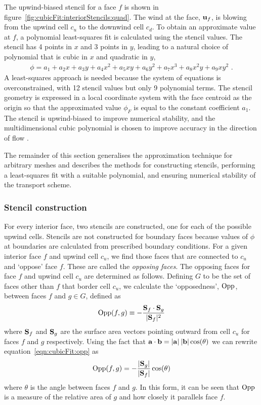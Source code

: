 The upwind-biased stencil for a face $f$ is shown in figure~\ref{fig:cubicFit:interiorStencils:quad}.  The wind at the face, $\mathbf{u}_f$, is blowing from the upwind cell $c_u$ to the downwind cell $c_d$.
To obtain an approximate value at $f$, a polynomial least-squares fit is calculated using the stencil values.
The stencil has \num{4} points in $x$ and \num{3} points in $y$, leading to a natural choice of polynomial that is cubic in $x$ and quadratic in $y$,
\begin{align}
	\phi = a_1 + a_2 x + a_3 y + a_4 x^2 + a_5 xy + a_6 y^2 + a_7 x^3 + a_8 x^2 y + a_9 x y^2 \label{eqn:cubicFit:fullPoly} \text{ .}
\end{align}
A least-squares approach is needed because the system of equations is overconstrained, with \num{12} stencil values but only \num{9} polynomial terms.  The stencil geometry is expressed in a local coordinate system with the face centroid as the origin so that the approximated value $\phi_F$ is equal to the constant coefficient $a_1$.
The stencil is upwind-biased to improve numerical stability, and the multidimensional cubic polynomial is chosen to improve accuracy in the direction of flow \citep{leonard1993}.

The remainder of this section generalises the approximation technique for arbitrary meshes and describes the methods for constructing stencils, performing a least-squares fit with a suitable polynomial, and ensuring numerical stability of the transport scheme.

\subsubsection{Stencil construction}
\label{sec:cubicFit:stencil}

For every interior face, two stencils are constructed, one for each of the possible upwind cells.
Stencils are not constructed for boundary faces because values of $\phi$ at boundaries are calculated from prescribed boundary conditions.
For a given interior face $f$ and upwind cell $c_u$, we find those faces that are connected to $c_u$ and `oppose' face $f$.  These are called the \textit{opposing faces}.
The opposing faces for face $f$ and upwind cell $c_u$ are determined as follows.
Defining $G$ to be the set of faces other than $f$ that border cell $c_u$, we calculate the `opposedness', $\mathrm{Opp}$, between faces $f$ and $g \in G$, defined as
\begin{align}
	\mathrm{Opp}(f, g) \equiv - \frac{\mathbf{S}_f \cdot \mathbf{S}_g}{\lvert \mathbf{S}_f \rvert^2} \label{eqn:cubicFit:opp}
\end{align}
where $\mathbf{S}_f$ and $\mathbf{S}_g$ are the surface area vectors pointing outward from cell $c_u$ for faces $f$ and $g$ respectively.
Using the fact that $\mathbf{a} \cdot \mathbf{b} = \lvert \mathbf{a} \rvert\:\lvert \mathbf{b} \rvert \cos(\theta)$ we can rewrite equation~\eqref{eqn:cubicFit:opp} as
\begin{align}
	\mathrm{Opp}(f, g) = - \frac{\lvert \mathbf{S}_g \rvert}{\lvert \mathbf{S}_f \rvert} \cos(\theta)
\end{align}
where $\theta$ is the angle between faces $f$ and $g$.  In this form, it can be seen that $\mathrm{Opp}$ is a measure of the relative area of $g$ and how closely it parallels face $f$.

